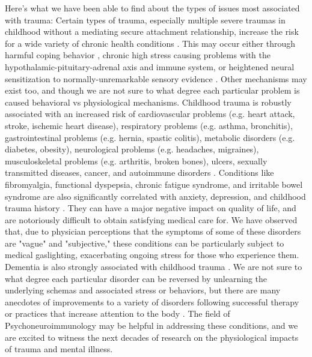 \documentclass[12pt,letterpaper]{book}
\begin{document}
Here's what we have been able to find about the types of issues most associated with trauma: Certain types of trauma, especially multiple severe traumas in childhood without a mediating secure attachment relationship, increase the risk for a wide variety of chronic health conditions \cite{harris2018deepest}. This may occur either through harmful coping behavior \cite{felittiACE}, chronic high stress causing problems with the hypothalamic-pituitary-adrenal axis \cite{CSAHealth} and immune system, or heightened neural sensitization to normally-unremarkable sensory evidence \cite{karimov2024childhood,fitzcharles2021nociplastic}. Other mechanisms may exist too, and though we are not sure to what degree each particular problem is caused behavioral vs physiological mechanisms. Childhood trauma is robustly associated with an increased risk of cardiovascular problems (e.g. heart attack, stroke, ischemic heart disease), respiratory problems (e.g. asthma, bronchitis), gastrointestinal problems (e.g. hernia, spastic colitis), metabolic disorders (e.g. diabetes, obesity), neurological problems (e.g. headaches, migraines), musculoskeletal problems (e.g. arthritis, broken bones), ulcers, sexually transmitted diseases, cancer, and autoimmune disorders \cite{wegman2009meta,norman2012long,hughes2017effect}. Conditions like fibromyalgia, functional dyspepsia, chronic fatigue syndrome, and irritable bowel syndrome are also significantly correlated with anxiety, depression, and childhood trauma history \cite{henningsenSomatic,gardoki2022prevalence,silvernale2024relationship}. They can have a major negative impact on quality of life, and are notoriously difficult to obtain satisfying medical care for. We have observed that, due to physician perceptions that the symptoms of some of these disorders are "vague" and "subjective," these conditions can be particularly subject to medical gaslighting, exacerbating ongoing stress for those who experience them. Dementia is also strongly associated with childhood trauma \cite{severs2023traumatic}. We are not sure to what degree each particular disorder can be reversed by unlearning the underlying schemas and associated stress or behaviors, but there are many anecdotes of improvements to a variety of disorders following successful therapy or practices that increase attention to the body \cite{vanderKolkBody}. The field of Psychoneuroimmunology may be helpful in addressing these conditions, and we are excited to witness the next decades of research on the physiological impacts of trauma and mental illness.
\end{document}
